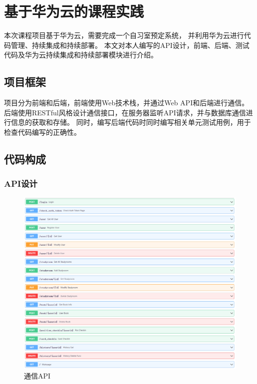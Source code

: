\chapter{基于华为云的课程实践}

本次课程项目基于华为云，需要完成一个自习室预定系统，
并利用华为云进行代码管理、持续集成和持续部署。
本文对本人编写的API设计，前端、后端、测试代码及华为云持续集成和持续部署模块进行介绍。

\section{项目框架}

项目分为前端和后端，前端使用Web技术栈，并通过Web API和后端进行通信。
后端使用RESTful风格设计通信接口，在服务器监听API请求，并与数据库通信进行信息的获取和存储。
同时，编写后端代码时同时编写相关单元测试用例，用于检查代码编写的正确性。

\section{代码构成}

\subsection{API设计}

\begin{figure}
    \centering
    \includegraphics[width=\textwidth]{figures/project/API.png}
    \caption{通信API}
    \label{fig:project_api}
\end{figure}

